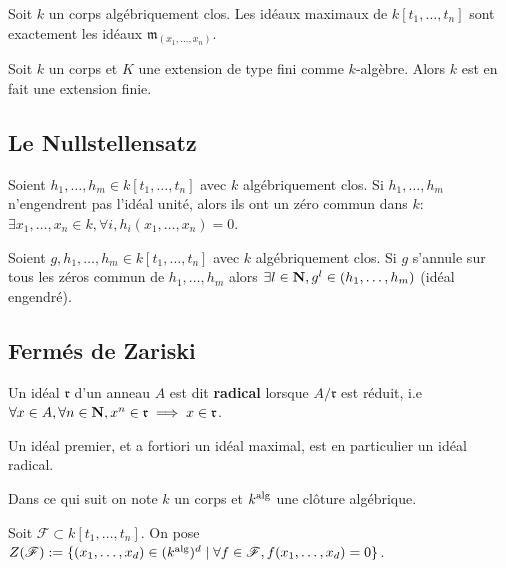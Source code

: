 	\begin{pop}
		Soit $k$ un corps algébriquement clos.
		Les idéaux maximaux de $k[t_1,\ldots,t_n]$ sont exactement les idéaux $\mathfrak{m}_{(x_1,\ldots,x_n)}$.
	\end{pop}
	
	\begin{pop}
		Soit $k$ un corps et $K$ une extension de type fini comme $k$-algèbre.
		Alors $k$ est en fait une extension finie.
	\end{pop}


\subsection{Le Nullstellensatz}

	\begin{pop}
		Soient $h_1,\ldots,h_m \in k[t_1,\ldots,t_n]$ avec $k$ algébriquement clos.
		Si $h_1,\ldots,h_m$ n'engendrent pas l'idéal unité, alors ils ont un zéro commun dans $k$: $\exists x_1,\ldots,x_n \in k, \forall i, h_i(x_1,\ldots,x_n) = 0$.
	\end{pop}

	\begin{pop}
		Soient $g, h_1,\ldots,h_m \in k[t_1,\ldots,t_n]$ avec $k$ algébriquement clos.
		Si $g$ s'annule sur tous les zéros commun de $h_1,\ldots,h_m$ alors $\exists l \in \mathbf{N}, g^l \in (h_1,\ldots,h_m)$ (idéal engendré).
	\end{pop}


\subsection{Fermés de Zariski}

	\begin{defn}
		Un idéal $\mathfrak{r}$ d'un anneau $A$ est dit \textbf{radical} lorsque $A / \mathfrak{r}$ est réduit, i.e $\forall x \in A, \forall n \in \mathbf{N}, x^n \in \mathfrak{r} \implies x \in \mathfrak{r}$.
	\end{defn}

	Un idéal premier, et a fortiori un idéal maximal, est en particulier un idéal radical.

	Dans ce qui suit on note $k$ un corps et $k^{\operatorname{alg}}$ une clôture algébrique.

	\begin{note}
		Soit $\mathscr{F} \subset k[t_1,\ldots,t_n]$.
		On pose $Z(\mathscr{F}) := \{ (x_1,\ldots,x_d) \in (k^{\operatorname{alg}})^d \mid \forall f \in \mathscr{F}, f(x_1,\ldots,x_d) = 0 \}$.
	\end{note}
	
